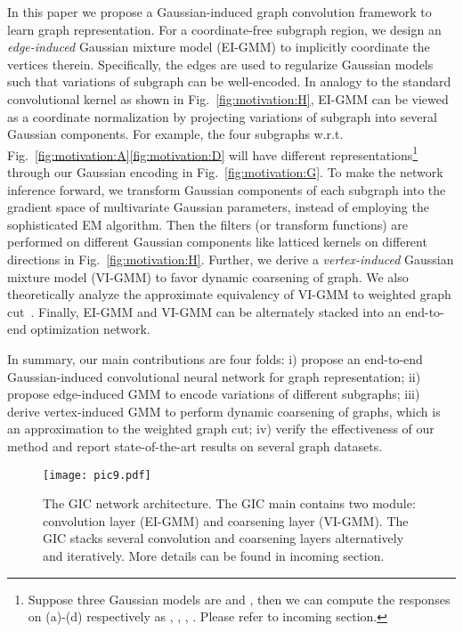 \documentclass[letterpaper]{article} \usepackage{aaai19}  \usepackage{times}  \usepackage{helvet}  \usepackage{courier}  \usepackage{url}  \usepackage{graphicx}  \frenchspacing  \setlength{\pdfpagewidth}{8.5in}  \setlength{\pdfpageheight}{11in}
\begin{document}
In this paper we propose a Gaussian-induced graph convolution framework to learn graph representation. For a coordinate-free subgraph region, we design an \textit{edge-induced} Gaussian mixture model (EI-GMM) to implicitly coordinate the vertices therein. Specifically, the edges are used to regularize Gaussian models such that variations of subgraph can be well-encoded. In analogy to the standard convolutional kernel as shown in Fig.~\ref{fig:motivation:H}, EI-GMM can be viewed as a coordinate normalization by projecting variations of subgraph into several Gaussian components. For example, the four subgraphs w.r.t. Fig.~\ref{fig:motivation:A}\ref{fig:motivation:D} will have different representations\footnote{Suppose three Gaussian models are  and , then we can compute the responses on (a)-(d) respectively as , , , . Please refer to incoming section.} through our Gaussian encoding in Fig.~\ref{fig:motivation:G}. To make the network inference forward, we transform Gaussian components of each subgraph into the gradient space of multivariate Gaussian parameters, instead of employing the sophisticated EM algorithm. Then the filters (or transform functions) are performed on different Gaussian components like latticed kernels on different directions in Fig.~\ref{fig:motivation:H}. Further, we derive a \textit{vertex-induced} Gaussian mixture model (VI-GMM) to favor dynamic coarsening of graph. We also theoretically analyze the approximate equivalency of VI-GMM to weighted graph cut~\cite{dhillon2007weighted}. Finally, EI-GMM and VI-GMM can be alternately stacked into an end-to-end optimization network.

In summary, our main contributions are four folds: i) propose an end-to-end Gaussian-induced convolutional neural network for graph representation; ii) propose edge-induced GMM to encode variations of different subgraphs; iii) derive vertex-induced GMM to perform dynamic coarsening of graphs, which is an approximation to the weighted graph cut; iv) verify the effectiveness of our method and report state-of-the-art results on several graph datasets.

\begin{figure*}[t]
	\centering
	\texttt{[image: pic9.pdf]}
	\caption{The GIC network architecture. The GIC main contains two module: convolution layer (EI-GMM) and coarsening layer (VI-GMM). The GIC stacks several convolution and coarsening layers alternatively and iteratively. More details can be found in incoming section.}
	\label{fig:network:A}
\end{figure*}
\end{document}
